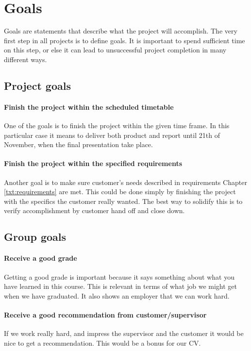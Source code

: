 \section{Goals}
Goals are statements that describe what the project will accomplish. 
The very first step in all projects is to define goals. 
It is important to spend sufficient time on this step, or else it can lead to unsuccessful project completion in many different ways. 
   
\label{sec:project-goals}

\subsection{Project goals}

\paragraph{Finish the project within the scheduled timetable}
One of the goals is to finish the project within the given time frame. 
In this particular case it means to deliver both product and report until 21th of November, when the final presentation take place.

\paragraph{Finish the project within the specified requirements}
Another goal is to make sure customer's needs described in requirements Chapter \ref{txt:requirements} are met.
This could be done simply by finishing the project with the specifics the customer really wanted. 
The best way to solidify this is to verify accomplishment by customer hand off and close down.

\subsection{Group goals}
\paragraph{Receive a good grade}
Getting a good grade is important because it says something about what you have learned in this course. 
This is relevant in terms of what job we might get when we have graduated. It also shows an employer that we can work hard. 
\paragraph{Receive a good recommendation from customer/supervisor}
If we work really hard, and impress the supervisor and the customer it would be nice to get a recommendation. This would be a bonus for our CV.

